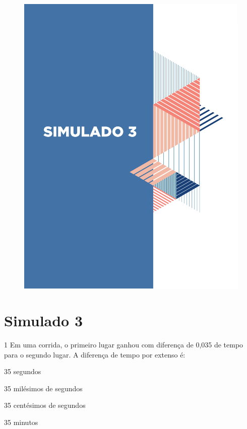 \begin{figure}
\vspace*{-3cm}
\hspace*{-3.7cm}\includegraphics[scale=1]{../watermarks/3simulado9ano.pdf}
\end{figure}


\pagebreak

\section*{Simulado 3}

\num{1} Em uma corrida, o primeiro lugar ganhou com diferença de 0,035 de
tempo para o segundo lugar. A diferença de tempo por extenso é:

\begin{escolha}
\item 35 segundos
\item 35 milésimos de segundos
\item 35 centésimos de segundos
\item 35 minutos
\end{escolha}

